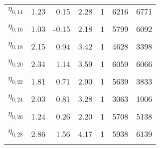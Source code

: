 \begin{table}
\begin{tabular}[t]{lrrrrrr}
$\eta_{0, 14}$ & 1.23 & 0.15 & 2.28 & 1 & 6216 & 6771\\
\cellcolor{gray!6}{$\eta_{0, 15}$} & \cellcolor{gray!6}{1.17} & \cellcolor{gray!6}{0.25} & \cellcolor{gray!6}{2.07} & \cellcolor{gray!6}{1} & \cellcolor{gray!6}{3446} & \cellcolor{gray!6}{1060}\\
$\eta_{0, 16}$ & 1.03 & -0.15 & 2.18 & 1 & 5799 & 6092\\
\cellcolor{gray!6}{$\eta_{0, 17}$} & \cellcolor{gray!6}{1.63} & \cellcolor{gray!6}{0.77} & \cellcolor{gray!6}{2.50} & \cellcolor{gray!6}{1} & \cellcolor{gray!6}{5952} & \cellcolor{gray!6}{5531}\\
$\eta_{0, 18}$ & 2.15 & 0.94 & 3.42 & 1 & 4628 & 3398\\
\cellcolor{gray!6}{$\eta_{0, 19}$} & \cellcolor{gray!6}{1.51} & \cellcolor{gray!6}{0.75} & \cellcolor{gray!6}{2.26} & \cellcolor{gray!6}{1} & \cellcolor{gray!6}{6157} & \cellcolor{gray!6}{3324}\\
$\eta_{0, 20}$ & 2.34 & 1.14 & 3.59 & 1 & 6059 & 6066\\
\cellcolor{gray!6}{$\eta_{0, 21}$} & \cellcolor{gray!6}{3.16} & \cellcolor{gray!6}{2.30} & \cellcolor{gray!6}{4.04} & \cellcolor{gray!6}{1} & \cellcolor{gray!6}{4006} & \cellcolor{gray!6}{3017}\\
$\eta_{0, 22}$ & 1.81 & 0.71 & 2.90 & 1 & 5639 & 3833\\
\cellcolor{gray!6}{$\eta_{0, 23}$} & \cellcolor{gray!6}{2.26} & \cellcolor{gray!6}{0.91} & \cellcolor{gray!6}{3.54} & \cellcolor{gray!6}{1} & \cellcolor{gray!6}{5404} & \cellcolor{gray!6}{5038}\\
$\eta_{0, 24}$ & 2.03 & 0.81 & 3.28 & 1 & 3063 & 1006\\
\cellcolor{gray!6}{$\eta_{0, 25}$} & \cellcolor{gray!6}{2.99} & \cellcolor{gray!6}{1.95} & \cellcolor{gray!6}{4.01} & \cellcolor{gray!6}{1} & \cellcolor{gray!6}{5046} & \cellcolor{gray!6}{4783}\\
$\eta_{0, 26}$ & 1.24 & 0.26 & 2.20 & 1 & 5708 & 5138\\
\cellcolor{gray!6}{$\eta_{0, 27}$} & \cellcolor{gray!6}{1.41} & \cellcolor{gray!6}{0.54} & \cellcolor{gray!6}{2.27} & \cellcolor{gray!6}{1} & \cellcolor{gray!6}{5816} & \cellcolor{gray!6}{4536}\\
$\eta_{0, 28}$ & 2.86 & 1.56 & 4.17 & 1 & 5938 & 6139\\
\cellcolor{gray!6}{$\eta_{0, 29}$} & \cellcolor{gray!6}{1.65} & \cellcolor{gray!6}{1.00} & \cellcolor{gray!6}{2.29} & \cellcolor{gray!6}{1} & \cellcolor{gray!6}{5872} & \cellcolor{gray!6}{5304}\\

\end{tabular}
\end{table}

